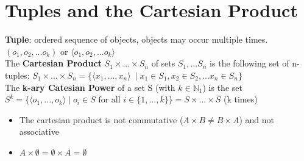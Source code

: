 \section*{Tuples and the Cartesian Product}
\textbf{Tuple}: ordered sequence of objects, objects may occur multiple times. $(o_1, o_2, ... o_k)$ or $\langle o_1, o_2, ... o_k\rangle$ \\
The \textbf{Cartesian Product} $S_1 \times  ... \times S_n$ of sets $S_1, ... S_n$ is the following set of n-tuples: $S_1 \times ... \times S_n = \{\langle x_1, ..., x_n\rangle\ \mid x_1 \in S_1, x_2 \in S_2, ... x_n \in S_n\}$
\vspace{0.5cm} \\
The \textbf{k-ary Catesian Power} of a set S (with $k \in \mathbb{N}_1$) is the set $S^k = \{\langle o_1, ..., o_k\rangle \mid o_i \in S \text{ for all } i \in \{1, ..., k\}\} = S \times ... \times S$ (k times)
\begin{itemize}[noitemsep,topsep=0pt,leftmargin=*]
    \item The cartesian product is not commutative ($A \times B \neq B \times A$) and not associative 
    \item $A \times \emptyset = \emptyset \times A = \emptyset$
\end{itemize}